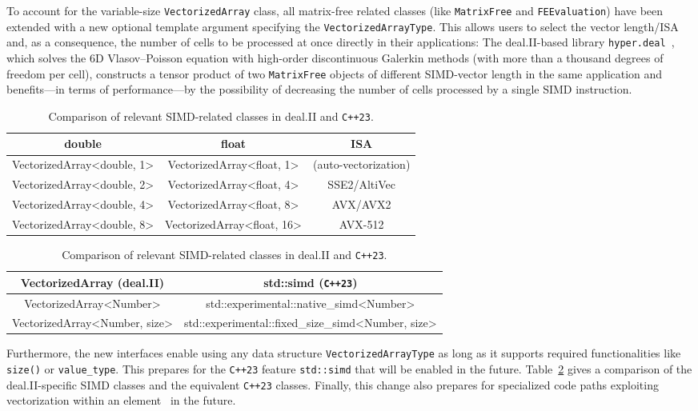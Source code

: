 \documentclass{ansarticle-preprint}
\begin{document}
To account for the variable-size \texttt{VectorizedArray} class, all matrix-free related classes (like \texttt{MatrixFree} and \texttt{FEEvaluation})
have been extended with a new optional template argument specifying the
\texttt{VectorizedArrayType}. This allows users to select the vector length/ISA and,
as a consequence, the number of cells to be processed at once directly in their applications:
The deal.II-based
library \texttt{hyper.deal}~\cite{munch2020hyperdeal}, which solves the 6D Vlasov--Poisson equation with high-order
discontinuous Galerkin methods (with more than a thousand degrees of freedom per cell), constructs a tensor product of two \texttt{MatrixFree} objects of different SIMD-vector
length in the same application and benefits---in terms of performance---by the possibility of decreasing the number of cells processed by a single SIMD instruction.


\begin{table}
\caption{Supported vector lengths of the class \texttt{VectorizedArray} and
the corresponding instruction-set-architecture extensions. }\label{tab:vectorizedarray}
\centering
\begin{tabular}{ccc}
\toprule
\textbf{double} & \textbf{float} & \textbf{ISA}\\
\midrule
VectorizedArray<double, 1> & VectorizedArray<float, 1> & (auto-vectorization) \\
VectorizedArray<double, 2> & VectorizedArray<float, 4> & SSE2/AltiVec \\
VectorizedArray<double, 4> & VectorizedArray<float, 8> & AVX/AVX2 \\
VectorizedArray<double, 8> & VectorizedArray<float, 16> & AVX-512 \\
\bottomrule
\end{tabular}

\caption{Comparison of relevant SIMD-related classes in deal.II and \texttt{C++23}.}\label{tab:simd}
\centering
\begin{tabular}{cc}
\toprule
\textbf{VectorizedArray (deal.II)} & \textbf{std::simd (\texttt{C++23})} \\
\midrule
VectorizedArray<Number> & std::experimental::native\_simd<Number> \\
VectorizedArray<Number, size> & std::experimental::fixed\_size\_simd<Number, size> \\ \bottomrule
\end{tabular}
\end{table}

Furthermore, the new interfaces enable using any data structure
\texttt{VectorizedArrayType} as long as it supports required
functionalities like \texttt{size()} or \texttt{value\_type}. This prepares
for the \texttt{C++23} feature \texttt{std::simd} that will be enabled in the future.
Table~\ref{tab:simd} gives a comparison of the deal.II-specific SIMD classes and
the equivalent \texttt{C++23} classes. Finally, this change also prepares for specialized
code paths exploiting
vectorization within an element~\cite{KronbichlerKormann2019} in the future.
\end{document}

